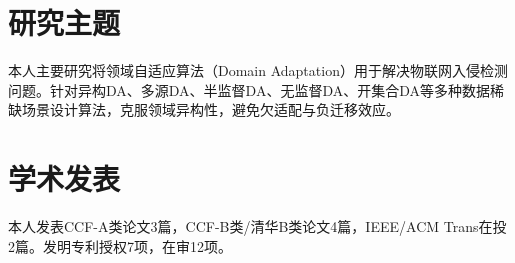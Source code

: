 \documentclass[letterpaper,11pt]{article}
\begin{document}
\vspace{1pt}




\section{研究主题}

本人主要研究将领域自适应算法（Domain Adaptation）用于解决物联网入侵检测问题。针对异构DA、多源DA、半监督DA、无监督DA、开集合DA等多种数据稀缺场景设计算法，克服领域异构性，避免欠适配与负迁移效应。

\vspace{1pt}




\section{学术发表}

本人发表CCF-A类论文3篇，CCF-B类/清华B类论文4篇，IEEE/ACM Trans在投2篇。发明专利授权7项，在审12项。
\end{document}
